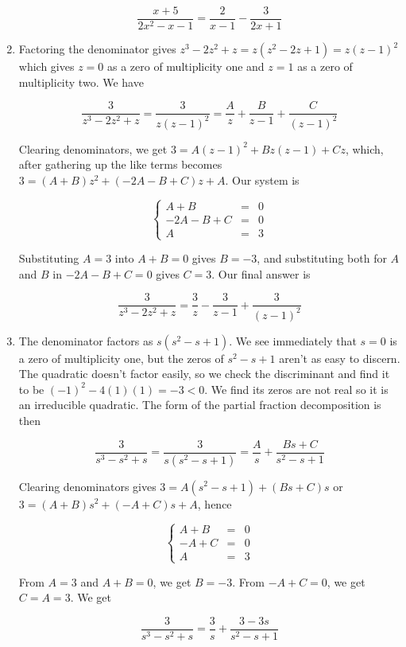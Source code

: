 \begin{ex}
\begin{enumerate}
\[\dfrac{x+5}{2x^2-x-1} = \dfrac{2}{x-1} -\dfrac{3}{2x+1} \]

\item  Factoring the denominator gives $z^3-2z^2+z = z\left(z^2-2z+1\right) = z(z-1)^2$ which gives $z=0$ as a zero of multiplicity one and $z=1$ as a zero of multiplicity two. We have

\[ \dfrac{3}{z^3-2z^2+z} = \dfrac{3}{z(z-1)^2} = \dfrac{A}{z} + \dfrac{B}{z-1} + \dfrac{C}{(z-1)^2} \]

Clearing denominators, we get $3 = A(z-1)^2 + Bz(z-1)+Cz$, which, after gathering up the like terms becomes $3 = (A+B)z^2+(-2A-B+C)z + A$.  Our system is 
 
\[ \left\{ \begin{array}{rcr}  A+B & = & 0 \\ -2A-B+C & = & 0 \\ A & = & 3 \end{array} \right.\]

Substituting $A=3$ into $A+B = 0$ gives $B = -3$, and substituting both for $A$ and $B$ in $-2A-B+C = 0$ gives $C = 3$.  Our final answer is

\[ \dfrac{3}{z^3-2z^2+z} = \dfrac{3}{z} - \dfrac{3}{z-1} + \dfrac{3}{(z-1)^2} \]

\item  The denominator factors as $s\left(s^2-s+1\right)$.  We see immediately that $s=0$ is a zero of multiplicity one, but the zeros of $s^2-s+1$ aren't as easy to discern.  The quadratic doesn't factor easily, so we check the discriminant and find it to be $(-1)^2-4(1)(1) = -3 < 0$.  We find its zeros are not real so it is an irreducible quadratic.  The form of the partial fraction decomposition is then

\[\dfrac{3}{s^3-s^2+s} = \dfrac{3}{s\left(s^2-s+1\right)} = \dfrac{A}{s} + \dfrac{Bs+C}{s^2-s+1}\]

Clearing denominators gives $3 = A\left(s^2-s+1\right) + (Bs+C)s$ or $3 = (A+B)s^2 + (-A+C)s +A$, hence

\[ \left\{ \begin{array}{rcr}  A+B & = & 0 \\ -A+C & = & 0 \\ A & = & 3 \end{array} \right.\]

From $A=3$ and $A+B = 0$, we get $B = -3$.  From $-A+C = 0$, we get $C = A = 3$.  We get


\[\dfrac{3}{s^3-s^2+s} =  \dfrac{3}{s} + \dfrac{3-3s}{s^2-s+1}\]


\end{enumerate}
\end{ex}
